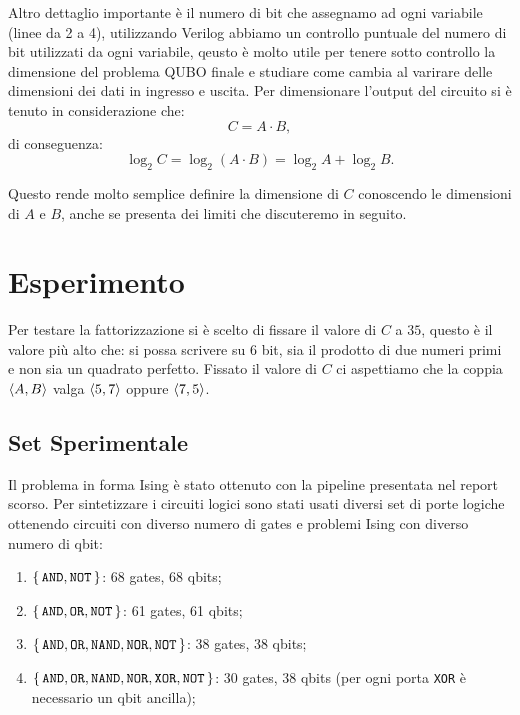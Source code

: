 \documentclass[]{article}
\begin{document}
	Altro dettaglio importante è il numero di bit che assegnamo ad ogni variabile (linee da 2 a 4), utilizzando Verilog abbiamo un controllo puntuale del numero di bit utilizzati da ogni variabile, qeusto è molto utile per tenere sotto controllo la dimensione del problema QUBO finale e studiare come cambia al varirare delle dimensioni dei dati in ingresso e uscita. Per dimensionare l'output del circuito si è tenuto in considerazione che:
	\[
		C = A \cdot B,
	\]
	di conseguenza:
	\begin{equation}
		\log_2C = \log_2(A \cdot B) = \log_2 A + \log_2 B.
		\label{eqn:bits}
	\end{equation}
	
	Questo rende molto semplice definire la dimensione di $C$ conoscendo le dimensioni di $A$ e $B$, anche se presenta dei limiti che discuteremo in seguito.
	
	\section{Esperimento}
	\label{sec:exp}
	Per testare la fattorizzazione si è scelto di fissare il valore di $C$ a $35$, questo è il valore più alto che: si possa scrivere su $6$ bit, sia il prodotto di due numeri primi e non sia un quadrato perfetto. Fissato il valore di $C$ ci aspettiamo che la coppia $\braket{A, B}$ valga $\braket{5, 7}$ oppure $\braket{7, 5}$.
		
	\subsection{Set Sperimentale}
	Il problema in forma Ising è stato ottenuto con la pipeline presentata nel report scorso\cite{bibid}. Per sintetizzare i circuiti logici sono stati usati diversi set di porte logiche ottenendo circuiti con diverso numero di gates e problemi Ising con diverso numero di qbit:
	\begin{enumerate}
		\label{enum:set}
		\item $\set{\texttt{AND}, \texttt{NOT}}$: 68 gates, 68 qbits;
		\item $\set{\texttt{AND}, \texttt{OR}, \texttt{NOT}}$: 61 gates, 61 qbits;
		\item $\set{\texttt{AND}, \texttt{OR}, \texttt{NAND}, \texttt{NOR}, \texttt{NOT}}$: 38 gates, 38 qbits;
		\item $\set{\texttt{AND}, \texttt{OR}, \texttt{NAND}, \texttt{NOR}, \texttt{XOR}, \texttt{NOT}}$: 30 gates, 38 qbits (per ogni porta \texttt{XOR} è necessario un qbit ancilla);
	\end{enumerate}
	
\end{document}

